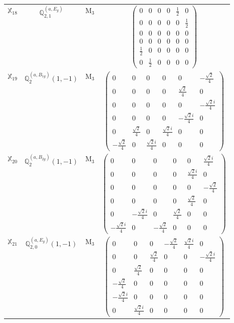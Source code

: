 \documentclass[fleqn,10pt,landscape]{article}
\begin{document}
\begin{itemize}
\begin{center}
\begin{longtable}{c|c|c|c}
$ \mathbb{X}_{18} $ & $\mathbb{Q}_{2,1}^{(a,E_{g})}$ & M$_{3}$ & $\begin{pmatrix} 0 & 0 & 0 & 0 & \frac{1}{2} & 0 \\ 0 & 0 & 0 & 0 & 0 & \frac{1}{2} \\ 0 & 0 & 0 & 0 & 0 & 0 \\ 0 & 0 & 0 & 0 & 0 & 0 \\ \frac{1}{2} & 0 & 0 & 0 & 0 & 0 \\ 0 & \frac{1}{2} & 0 & 0 & 0 & 0 \end{pmatrix}$ \\
$ \mathbb{X}_{19} $ & $\mathbb{Q}_{2}^{(a,B_{1g})}(1,-1)$ & M$_{3}$ & $\begin{pmatrix} 0 & 0 & 0 & 0 & 0 & - \frac{\sqrt{2}}{4} \\ 0 & 0 & 0 & 0 & \frac{\sqrt{2}}{4} & 0 \\ 0 & 0 & 0 & 0 & 0 & - \frac{\sqrt{2} i}{4} \\ 0 & 0 & 0 & 0 & - \frac{\sqrt{2} i}{4} & 0 \\ 0 & \frac{\sqrt{2}}{4} & 0 & \frac{\sqrt{2} i}{4} & 0 & 0 \\ - \frac{\sqrt{2}}{4} & 0 & \frac{\sqrt{2} i}{4} & 0 & 0 & 0 \end{pmatrix}$ \\
$ \mathbb{X}_{20} $ & $\mathbb{Q}_{2}^{(a,B_{2g})}(1,-1)$ & M$_{3}$ & $\begin{pmatrix} 0 & 0 & 0 & 0 & 0 & \frac{\sqrt{2} i}{4} \\ 0 & 0 & 0 & 0 & \frac{\sqrt{2} i}{4} & 0 \\ 0 & 0 & 0 & 0 & 0 & - \frac{\sqrt{2}}{4} \\ 0 & 0 & 0 & 0 & \frac{\sqrt{2}}{4} & 0 \\ 0 & - \frac{\sqrt{2} i}{4} & 0 & \frac{\sqrt{2}}{4} & 0 & 0 \\ - \frac{\sqrt{2} i}{4} & 0 & - \frac{\sqrt{2}}{4} & 0 & 0 & 0 \end{pmatrix}$ \\
$ \mathbb{X}_{21} $ & $\mathbb{Q}_{2,0}^{(a,E_{g})}(1,-1)$ & M$_{3}$ & $\begin{pmatrix} 0 & 0 & 0 & - \frac{\sqrt{2}}{4} & \frac{\sqrt{2} i}{4} & 0 \\ 0 & 0 & \frac{\sqrt{2}}{4} & 0 & 0 & - \frac{\sqrt{2} i}{4} \\ 0 & \frac{\sqrt{2}}{4} & 0 & 0 & 0 & 0 \\ - \frac{\sqrt{2}}{4} & 0 & 0 & 0 & 0 & 0 \\ - \frac{\sqrt{2} i}{4} & 0 & 0 & 0 & 0 & 0 \\ 0 & \frac{\sqrt{2} i}{4} & 0 & 0 & 0 & 0 \end{pmatrix}$ \\

\end{longtable}
\end{center}
\end{itemize}
\end{document}
